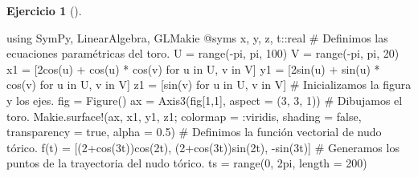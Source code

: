 \documentclass[
  a4paper,
]{scrreport}
\newenvironment{Shaded}{\begin{snugshade}}{\end{snugshade}}
\newcommand{\BuiltInTok}[1]{\textcolor[rgb]{0.00,0.23,0.31}{#1}}
\newcommand{\CommentTok}[1]{\textcolor[rgb]{0.37,0.37,0.37}{#1}}
\newcommand{\ConstantTok}[1]{\textcolor[rgb]{0.56,0.35,0.01}{#1}}
\newcommand{\DataTypeTok}[1]{\textcolor[rgb]{0.68,0.00,0.00}{#1}}
\newcommand{\FloatTok}[1]{\textcolor[rgb]{0.68,0.00,0.00}{#1}}
\newcommand{\FunctionTok}[1]{\textcolor[rgb]{0.28,0.35,0.67}{#1}}
\newcommand{\ImportTok}[1]{\textcolor[rgb]{0.00,0.46,0.62}{#1}}
\newcommand{\KeywordTok}[1]{\textcolor[rgb]{0.00,0.23,0.31}{#1}}
\newcommand{\NormalTok}[1]{\textcolor[rgb]{0.00,0.23,0.31}{#1}}
\newcommand{\OperatorTok}[1]{\textcolor[rgb]{0.37,0.37,0.37}{#1}}
\newcommand{\PreprocessorTok}[1]{\textcolor[rgb]{0.68,0.00,0.00}{#1}}
\theoremstyle{definition}
\newtheorem{exercise}{Ejercicio}[chapter]
\theoremstyle{remark}
\begin{document}
\begin{exercise}[]
\begin{tcolorbox}
\begin{Shaded}
\begin{Highlighting}[]
\ImportTok{using} \BuiltInTok{SymPy}\NormalTok{, }\BuiltInTok{LinearAlgebra}\NormalTok{, }\BuiltInTok{GLMakie}
\PreprocessorTok{@syms}\NormalTok{ x, y, z, t}\OperatorTok{::}\DataTypeTok{real}
\CommentTok{\# Definimos las ecuaciones paramétricas del toro.}
\NormalTok{U }\OperatorTok{=} \FunctionTok{range}\NormalTok{(}\OperatorTok{{-}}\ConstantTok{pi}\NormalTok{, }\ConstantTok{pi}\NormalTok{, }\FloatTok{100}\NormalTok{)}
\NormalTok{V }\OperatorTok{=} \FunctionTok{range}\NormalTok{(}\OperatorTok{{-}}\ConstantTok{pi}\NormalTok{, }\ConstantTok{pi}\NormalTok{, }\FloatTok{20}\NormalTok{)}
\NormalTok{x1 }\OperatorTok{=}\NormalTok{ [}\FloatTok{2}\FunctionTok{cos}\NormalTok{(u) }\OperatorTok{+} \FunctionTok{cos}\NormalTok{(u) }\OperatorTok{*} \FunctionTok{cos}\NormalTok{(v) for u }\KeywordTok{in}\NormalTok{ U, v }\KeywordTok{in}\NormalTok{ V]}
\NormalTok{y1 }\OperatorTok{=}\NormalTok{ [}\FloatTok{2}\FunctionTok{sin}\NormalTok{(u) }\OperatorTok{+} \FunctionTok{sin}\NormalTok{(u) }\OperatorTok{*} \FunctionTok{cos}\NormalTok{(v) for u }\KeywordTok{in}\NormalTok{ U, v }\KeywordTok{in}\NormalTok{ V]}
\NormalTok{z1 }\OperatorTok{=}\NormalTok{ [}\FunctionTok{sin}\NormalTok{(v) for u }\KeywordTok{in}\NormalTok{ U, v }\KeywordTok{in}\NormalTok{ V]}
\CommentTok{\# Inicializamos la figura y los ejes.}
\NormalTok{fig }\OperatorTok{=} \FunctionTok{Figure}\NormalTok{()}
\NormalTok{ax }\OperatorTok{=} \FunctionTok{Axis3}\NormalTok{(fig[}\FloatTok{1}\NormalTok{,}\FloatTok{1}\NormalTok{], aspect }\OperatorTok{=}\NormalTok{ (}\FloatTok{3}\NormalTok{, }\FloatTok{3}\NormalTok{, }\FloatTok{1}\NormalTok{))}
\CommentTok{\# Dibujamos el toro.}
\NormalTok{Makie.}\FunctionTok{surface!}\NormalTok{(ax, x1, y1, z1; colormap }\OperatorTok{=} \OperatorTok{:}\NormalTok{viridis, shading }\OperatorTok{=} \ConstantTok{false}\NormalTok{, transparency }\OperatorTok{=} \ConstantTok{true}\NormalTok{, alpha }\OperatorTok{=} \FloatTok{0.5}\NormalTok{)}
\CommentTok{\# Definimos la función vectorial de nudo tórico.}
\FunctionTok{f}\NormalTok{(t) }\OperatorTok{=}\NormalTok{ [(}\FloatTok{2}\FunctionTok{+cos}\NormalTok{(}\FloatTok{3}\NormalTok{t))}\FunctionTok{cos}\NormalTok{(}\FloatTok{2}\NormalTok{t), (}\FloatTok{2}\FunctionTok{+cos}\NormalTok{(}\FloatTok{3}\NormalTok{t))}\FunctionTok{sin}\NormalTok{(}\FloatTok{2}\NormalTok{t), }\FunctionTok{{-}sin}\NormalTok{(}\FloatTok{3}\NormalTok{t)] }
\CommentTok{\# Generamos los puntos de la trayectoria del nudo tórico.}
\NormalTok{ts }\OperatorTok{=} \FunctionTok{range}\NormalTok{(}\FloatTok{0}\NormalTok{, }\FloatTok{2}\NormalTok{pi, length }\OperatorTok{=} \FloatTok{200}\NormalTok{)}

\end{Highlighting}
\end{Shaded}
\end{tcolorbox}
\end{exercise}
\end{document}
